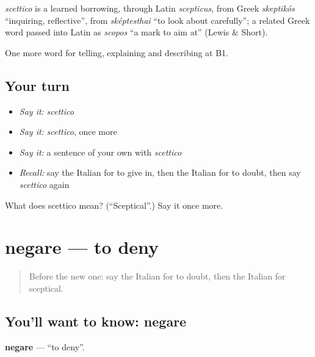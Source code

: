 \begin{cousinweb}
\emph{scettico} is a learned borrowing, through Latin \emph{scepticus}, from Greek \emph{skeptikós} \textquotedblleft{}inquiring, reflective\textquotedblright{}, from \emph{sképtesthai} \textquotedblleft{}to look about carefully\textquotedblright{}; a related Greek word passed into Latin as \emph{scopos} \textquotedblleft{}a mark to aim at\textquotedblright{} (Lewis \& Short).
\end{cousinweb}

\begin{grammarlens}[title={What you've built}]
One more word for telling, explaining and describing at B1.
\end{grammarlens}

\subsection*{Your turn}
\begin{itemize}
\raggedright
  \item \emph{Say it:} \emph{scettico}
  \item \emph{Say it:} \emph{scettico}, once more
  \item \emph{Say it:} a sentence of your own with \emph{scettico}
  \item \emph{Recall:} say the Italian for to give in, then the Italian for to doubt, then say \emph{scettico} again
\end{itemize}

\begin{tcolorbox}[breakable,colback=teal!4,colframe=teal!35!black,title={Before you move on}]
What does scettico mean? (\textquotedblleft{}Sceptical\textquotedblright{}.) Say it once more.
\end{tcolorbox}
\section[negare]{negare — to deny}

\label{lesson:IT-C343-negare}



\begin{quote}
Before the new one: say the Italian for to doubt, then the Italian for sceptical.
\end{quote}

\subsection*{You'll want to know: negare}
\textbf{negare} — \textquotedblleft{}to deny\textquotedblright{}.

